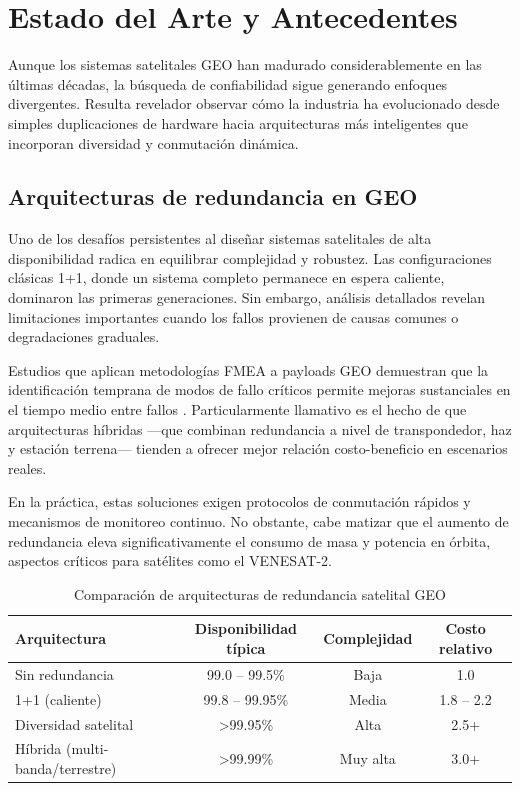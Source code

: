 \section{Estado del Arte y Antecedentes}

Aunque los sistemas satelitales GEO han madurado considerablemente en las últimas décadas, la búsqueda de confiabilidad sigue generando enfoques divergentes. Resulta revelador observar cómo la industria ha evolucionado desde simples duplicaciones de hardware hacia arquitecturas más inteligentes que incorporan diversidad y conmutación dinámica.

\subsection{Arquitecturas de redundancia en GEO}

Uno de los desafíos persistentes al diseñar sistemas satelitales de alta disponibilidad radica en equilibrar complejidad y robustez. Las configuraciones clásicas 1+1, donde un sistema completo permanece en espera caliente, dominaron las primeras generaciones. Sin embargo, análisis detallados revelan limitaciones importantes cuando los fallos provienen de causas comunes o degradaciones graduales.

Estudios que aplican metodologías FMEA a payloads GEO demuestran que la identificación temprana de modos de fallo críticos permite mejoras sustanciales en el tiempo medio entre fallos \cite{ReliabilityGEO2013}. Particularmente llamativo es el hecho de que arquitecturas híbridas —que combinan redundancia a nivel de transpondedor, haz y estación terrena— tienden a ofrecer mejor relación costo-beneficio en escenarios reales. 

En la práctica, estas soluciones exigen protocolos de conmutación rápidos y mecanismos de monitoreo continuo. No obstante, cabe matizar que el aumento de redundancia eleva significativamente el consumo de masa y potencia en órbita, aspectos críticos para satélites como el VENESAT-2.

\begin{table}[h]
\centering
\caption{Comparación de arquitecturas de redundancia satelital GEO}
\label{tab:arquitecturas}
\begin{tabular}{lccc}
\hline
\textbf{Arquitectura} & \textbf{Disponibilidad típica} & \textbf{Complejidad} & \textbf{Costo relativo} \\
\hline
Sin redundancia & 99.0 -- 99.5\% & Baja & 1.0 \\
1+1 (caliente) & 99.8 -- 99.95\% & Media & 1.8 -- 2.2 \\
Diversidad satelital & >99.95\% & Alta & 2.5+ \\
Híbrida (multi-banda/terrestre) & >99.99\% & Muy alta & 3.0+ \\
\hline
\end{tabular}
\end{table}

